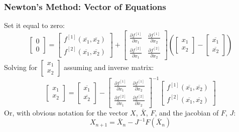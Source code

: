 \documentclass{beamer}
\begin{document}
\begin{frame}
\frametitle[alignment=center]{Newton's Method: Vector of Equations}
Set it equal to zero:
$$\left[\begin{array}{c}0 \\ 0\end{array}\right]= \left[\begin{array}{c}f^{[1]}(\overline{x_1},\overline{x_2}) \\ f^{[2]}(\overline{x_1},\overline{x_2})\end{array}\right]+ \left[\begin{array}{cc}\frac{\partial f^{[1]}}{\partial x_1} & \frac{\partial f^{[1]}}{\partial x_2} \\\frac{\partial f^{[2]}}{\partial x_1} & \frac{\partial f^{[2]}}{\partial x_2}\end{array}\right]\left(\left[\begin{array}{c}x_1 \\ x_2\end{array}\right]-\left[\begin{array}{c}\overline{x_1} \\ \overline{x_2}\end{array}\right]\right)$$
Solving for $\left[\begin{array}{c}x_1 \\ x_2\end{array}\right]$ assuming and inverse matrix:
$$\left[\begin{array}{c}x_1 \\ x_2\end{array}\right]=\left[\begin{array}{c}\overline{x_1} \\ \overline{x_2}\end{array}\right]-\left[\begin{array}{cc}\frac{\partial f^{[1]}}{\partial x_1} & \frac{\partial f^{[1]}}{\partial x_2} \\\frac{\partial f^{[2]}}{\partial x_1} & \frac{\partial f^{[2]}}{\partial x_2}\end{array}\right]^{-1}\left[\begin{array}{c}f^{[1]}(\overline{x_1},\overline{x_2}) \\ f^{[2]}(\overline{x_1},\overline{x_2})\end{array}\right]$$
Or, with obvious notation for the vector $X$, $\bar{X}$, $F$, and the jacobian of $F$, $J$:
$$X_{n+1}=\bar{X}_n-J^{-1}F(\bar{X}_n)$$
\end{frame}
\end{document}
